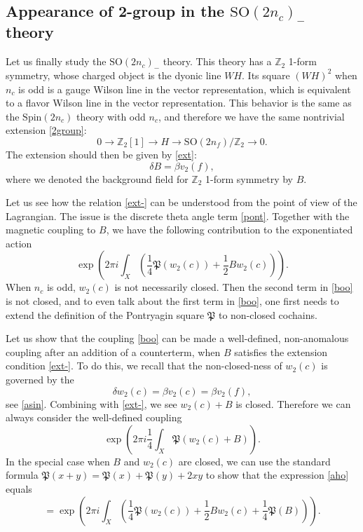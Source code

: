 \documentclass[12pt]{article}
\numberwithin{equation}{section}
\newcommand*{\bZ}{\mathbb{Z}}
\newcommand*{\fP}{\mathfrak{P}}
\def\SO{\mathrm{SO}}
\def\Spin{\mathrm{Spin}}
\begin{document}
\newpage

\subsection{Appearance of 2-group in the $\SO(2n_c)_-$ theory}
Let us finally study the $\SO(2n_c)_-$ theory.
This theory has a $\bZ_2$ 1-form symmetry,
whose charged object is the dyonic line $WH$.
Its square $(WH)^2$ when $n_c$ is odd is a gauge Wilson line in the vector representation,
which is equivalent to a flavor Wilson line in the vector representation.
This behavior is the same as the $\Spin(2n_c)$ theory with odd $n_c$,
and therefore we have the same nontrivial extension \eqref{2group}:
\begin{equation}
0\to \bZ_2[1] \to  H \to \SO(2n_f)/\bZ_2 \to 0.
\end{equation}
The extension should then be given by \eqref{ext}: \begin{equation}
\delta B= \beta v_2(f),
\label{ext-}
\end{equation} where we denoted the background field for $\bZ_2$ 1-form symmetry by $B$.

Let us see how the relation \eqref{ext-} can be understood from the point of view of the Lagrangian.
The issue is the discrete theta angle term \eqref{pont}.
Together with the magnetic coupling to $B$, we have the following contribution to the exponentiated action \begin{equation}
\exp\left(2\pi i\int_X ( \frac14 \mathfrak{P}(w_2(c)) +\frac12 B w_2(c))\right).
\label{boo}
\end{equation}
When $n_c$ is odd, $w_2(c)$ is not necessarily closed.
Then the second term in \eqref{boo} is not closed, 
and to even talk about the first term in \eqref{boo}, one first needs to extend the definition of the Pontryagin square $\fP$ to non-closed cochains.

Let us show that the coupling \eqref{boo} can be made a well-defined, non-anomalous coupling after an addition of a counterterm, when $B$ satisfies the extension condition \eqref{ext-}.
To do this, we recall that the non-closed-ness of $w_2(c)$ is governed by the \begin{equation}
\delta w_2(c)=\beta v_2(c)= \beta v_2(f), 
\end{equation} see \eqref{asin}.
Combining with \eqref{ext-}, we see $w_2(c)+B$  is closed. 
Therefore we can always consider the well-defined coupling \begin{equation}
\exp \left(2\pi i \frac14 \int_X \fP(w_2(c)+B)\right) .
\label{aho}
\end{equation}
In the special case when $B$ and $w_2(c)$ are closed, we can use the standard formula $\fP(x+y)=\fP(x)+\fP(y)+2 xy$ to show that the expression \eqref{aho} equals
\begin{equation}
= \exp\left(2\pi i \int_X 
 ( \frac14 \mathfrak{P}(w_2(c)) +\frac12 B w_2(c) +\frac14 \mathfrak{P}(B) )
\right) .
\label{fPB}
\end{equation}
\end{document}
